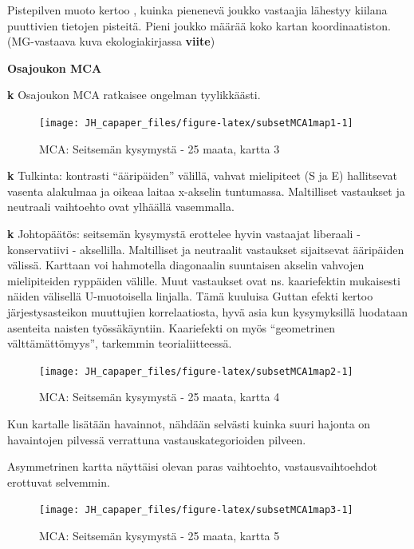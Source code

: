 \documentclass[
  finnish,
]{book}
\begin{document}
Pistepilven muoto kertoo , kuinka pienenevä joukko vastaajia lähestyy
kiilana puuttivien tietojen pisteitä. Pieni joukko määrää koko kartan
koordinaatiston. (MG-vastaava kuva ekologiakirjassa \textbf{viite})

\textbf{Osajoukon MCA}

\textbf{k} Osajoukon MCA ratkaisee ongelman tyylikkäästi.

\begin{figure}

{\centering \texttt{[image: JH\_capaper\_files/figure-latex/subsetMCA1map1-1]} 

}

\caption{MCA: Seitsemän kysymystä - 25 maata, kartta 3}\label{fig:subsetMCA1map1}
\end{figure}

\textbf{k} Tulkinta: kontrasti ``ääripäiden'' välillä, vahvat
mielipiteet (S ja E) hallitsevat vasenta alakulmaa ja oikeaa laitaa
x-akselin tuntumassa. Maltilliset vastaukset ja neutraali vaihtoehto
ovat ylhäällä vasemmalla.

\textbf{k} Johtopäätös: seitsemän kysymystä erottelee hyvin vastaajat
liberaali - konservatiivi - aksellilla. Maltilliset ja neutraalit
vastaukset sijaitsevat ääripäiden välissä. Karttaan voi hahmotella
diagonaalin suuntaisen akselin vahvojen mielipiteiden ryppäiden välille.
Muut vastaukset ovat ns. kaariefektin mukaisesti näiden välisellä
U-muotoisella linjalla. Tämä kuuluisa Guttan efekti kertoo
järjestysasteikon muuttujien korrelaatiosta, hyvä asia kun kysymyksillä
luodataan asenteita naisten työssäkäyntiin. Kaariefekti on myös
``geometrinen välttämättömyys'', tarkemmin teorialiitteessä.

\begin{figure}

{\centering \texttt{[image: JH\_capaper\_files/figure-latex/subsetMCA1map2-1]} 

}

\caption{MCA: Seitsemän kysymystä - 25 maata, kartta 4}\label{fig:subsetMCA1map2}
\end{figure}

Kun kartalle lisätään havainnot, nähdään selvästi kuinka suuri hajonta
on havaintojen pilvessä verrattuna vastauskategorioiden pilveen.

Asymmetrinen kartta näyttäisi olevan paras vaihtoehto,
vastausvaihtoehdot erottuvat selvemmin.

\begin{figure}

{\centering \texttt{[image: JH\_capaper\_files/figure-latex/subsetMCA1map3-1]} 

}

\caption{MCA: Seitsemän kysymystä - 25 maata, kartta 5}\label{fig:subsetMCA1map3}
\end{figure}
\end{document}
